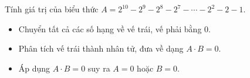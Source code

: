 \begin{vd}
	Tính giá trị của biểu thức $A=2^{10}-2^9-2^8-2^7-\cdots -2^2-2-1$.	
\end{vd}



\begin{dang}[Tìm $x$]
\begin{itemize}
\item Chuyển tất cả các số hạng về vế trái, vế phải bằng $0$.
\item Phân tích vế trái thành nhân tử, đưa về dạng $A\cdot B=0$.
\item Áp dụng $A\cdot B=0$ suy ra $A=0$ hoặc $B=0$.
\end{itemize}
\end{dang}

